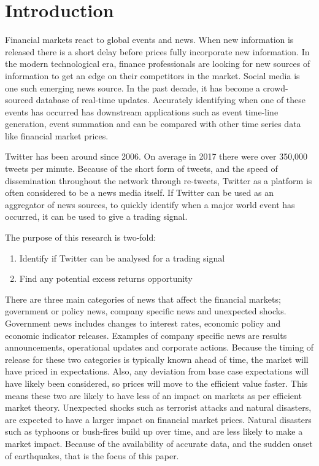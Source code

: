 \chapter{Introduction}

Financial markets react to global events and news\cite{efficient_markets}. When new information is released there is a short delay before prices fully incorporate new information. In the modern technological era, finance professionals are looking for new sources of information to get an edge on their competitors in the market. Social media is one such emerging news source. In the past decade, it has become a crowd-sourced database of real-time updates. Accurately identifying when one of these events has occurred has downstream applications such as event time-line generation, event summation and can be compared with other time series data like financial market prices.

Twitter has been around since 2006. On average in 2017 there were over 350,000 tweets per minute\cite{social_stats}. Because of the short form of tweets, and the speed of dissemination throughout the network through re-tweets, Twitter as a platform is often considered to be a news media itself\cite{Twitter_social}. If Twitter can be used as an aggregator of news sources, to quickly identify when a major world event has occurred, it can be used to give a trading signal.

The purpose of this research is two-fold:
\begin{enumerate}
\item Identify if Twitter can be analysed for a trading signal
\item Find any potential excess returns opportunity
\end{enumerate}

There are three main categories of news that affect the financial markets; government or policy news, company specific news and unexpected shocks\cite{mindell_market}. Government news includes changes to interest rates, economic policy and economic indicator releases. Examples of company specific news are results announcements, operational updates and corporate actions. Because the timing of release for these two categories is typically known ahead of time, the market will have priced in expectations. Also, any deviation from base case expectations will have likely been considered, so prices will move to the efficient value faster. This means these two are likely to have less of an impact on markets as per efficient market theory\cite{efficient_markets}. Unexpected shocks such as terrorist attacks and natural disasters, are expected to have a larger impact on financial market prices\cite{market_shock}. Natural disasters such as typhoons or bush-fires build up over time, and are less likely to make a market impact. Because of the availability of accurate data, and the sudden onset of earthquakes, that is the focus of this paper.

